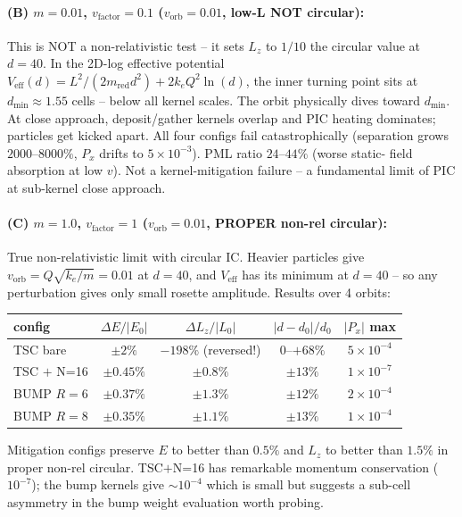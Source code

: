 \documentclass[11pt,a4paper]{article}
\begin{document}
\paragraph{(B) $m{=}0.01$, $v_{\mathrm{factor}}{=}0.1$ ($v_{\mathrm{orb}}{=}0.01$, low-L NOT circular):}
This is NOT a non-relativistic test -- it sets $L_z$ to $1/10$ the
circular value at $d{=}40$.  In the 2D-log effective potential
$V_{\mathrm{eff}}(d) = L^2/(2 m_{\mathrm{red}} d^2) + 2 k_e Q^2 \ln(d)$,
the inner turning point sits at $d_{\min} \approx 1.55$ cells --
below all kernel scales.  The orbit physically dives toward
$d_{\min}$.  At close approach, deposit/gather kernels overlap and
PIC heating dominates; particles get kicked apart.  All four configs
fail catastrophically (separation grows $2000$--$8000\%$, $P_x$
drifts to $5 \times 10^{-3}$).  PML ratio $24$--$44\%$ (worse static-
field absorption at low $v$).  Not a kernel-mitigation failure -- a
fundamental limit of PIC at sub-kernel close approach.

\paragraph{(C) $m{=}1.0$, $v_{\mathrm{factor}}{=}1$ ($v_{\mathrm{orb}}{=}0.01$, PROPER non-rel circular):}
True non-relativistic limit with circular IC.  Heavier particles
give $v_{\mathrm{orb}} = Q\sqrt{k_e/m} = 0.01$ at $d{=}40$, and
$V_{\mathrm{eff}}$ has its minimum at $d{=}40$ -- so any perturbation
gives only small rosette amplitude.  Results over 4 orbits:

\begin{center}
\begin{tabular}{lcccc}
\toprule
config & $\Delta E / |E_0|$ & $\Delta L_z / |L_0|$ & $|d - d_0|/d_0$ & $|P_x|$ max \\
\midrule
TSC bare        & $\pm 2\%$        & $-198\%$ (reversed!) & $0$--$+68\%$ & $5 \times 10^{-4}$ \\
TSC $+$ N=16    & $\pm 0.45\%$     & $\pm 0.8\%$          & $\pm 13\%$   & $1 \times 10^{-7}$ \\
BUMP $R{=}6$    & $\pm 0.37\%$     & $\pm 1.3\%$          & $\pm 12\%$   & $2 \times 10^{-4}$ \\
BUMP $R{=}8$    & $\pm 0.35\%$     & $\pm 1.1\%$          & $\pm 13\%$   & $1 \times 10^{-4}$ \\
\bottomrule
\end{tabular}
\end{center}

Mitigation configs preserve $E$ to better than $0.5\%$ and $L_z$ to
better than $1.5\%$ in proper non-rel circular.  TSC$+$N=16 has
remarkable momentum conservation ($10^{-7}$); the bump kernels give
$\sim 10^{-4}$ which is small but suggests a sub-cell asymmetry in
the bump weight evaluation worth probing.
\end{document}
